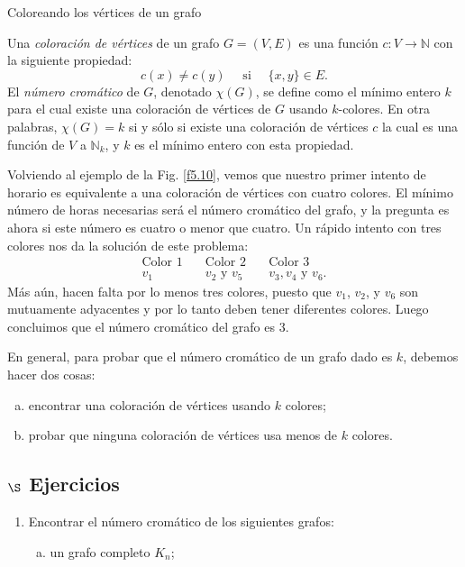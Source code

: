 \begin{section}{Coloreando los vértices de un grafo}
\begin{definicion} Una {\em coloración de vértices} de un  
grafo $G=(V,E)$ es una función $c:V \to  \mathbb N$ con la
siguiente propiedad:
$$
c(x)\not= c(y) \quad \text{ si } \quad \{x,y\} \in E.
$$
El {\em número cromático} de $G$, denotado $\chi(G)$, se define
 como el mínimo entero $k$ para el cual
existe una coloración de vértices de $G$ usando $k$-colores. En
otra palabras, $\chi(G)=k$ si  y sólo si existe una coloración de
vértices $c$ la cual es una función de $V$ a $\mathbb N_k$, y $k$
es el mínimo entero con esta propiedad.
\end{definicion}

Volviendo al ejemplo de la Fig. \ref{f5.10}, vemos que nuestro
primer intento de horario es equivalente a una coloración de
vértices con cuatro colores. El mínimo número de horas necesarias
será el número cromático del grafo, y la pregunta es ahora si este
número es cuatro o menor que cuatro. Un rápido intento con tres
colores nos da la solución de este problema:
$$
\begin{matrix}
\text{Color 1}\quad &\text{Color 2}\quad&\text{Color 3} \\
v_1 &v_2 \text{ y } v_5 \quad & v_3,v_4 \text{ y } v_6 .
\end{matrix}
$$
Más aún, hacen falta por lo menos tres colores, puesto que $v_1$,
$v_2$, y $v_6$ son mutuamente adyacentes y por lo tanto deben
tener diferentes colores. Luego concluimos que el número cromático
del grafo es $3$.

En general, para probar que el número cromático de un grafo dado
es $k$, debemos hacer dos cosas:
\begin{enumerate}[a)]
\item encontrar una coloración de vértices usando $k$ colores;
\item probar que ninguna coloración de vértices usa menos de $k$ colores.
\end{enumerate}



\subsection*{\Large $\S$ Ejercicios}\label{ejercicios5.6}
\begin{enumerate}[1)]
\item \label{ejercicio5.6.1} Encontrar el número cromático de los siguientes grafos:
\begin{enumerate}[a)]
	\item un grafo completo $K_n$;
	

\end{enumerate}
\end{enumerate}
\end{section}

